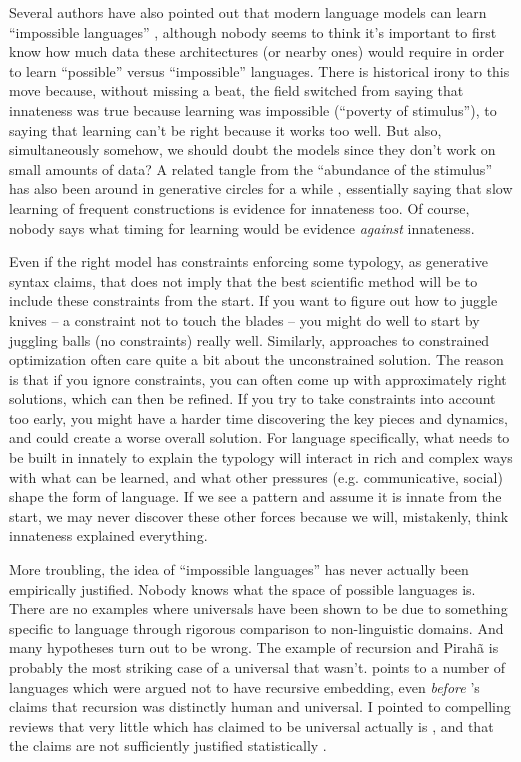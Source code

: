 \documentclass[output=paper,colorlinks,citecolor=brown]{langscibook}
\begin{document}
Several authors have also pointed out that modern language models can learn ``impossible languages'' \citep{milway2023response,moro2023large}, although nobody seems to think it's important to first know how much data these architectures (or nearby ones) would require in order to learn ``possible'' versus ``impossible'' languages. There is historical irony to this move because, without missing a beat, the field switched from saying that innateness was true because learning was impossible (``poverty of stimulus''), to saying that learning can't be right because it works too well. But also, simultaneously somehow, we should doubt the models since they don't work  on small amounts of data? A related tangle from the ``abundance of the stimulus'' has also been around in generative circles for a while \citep{babyonyshev2001maturation}, essentially saying that slow learning of frequent constructions is evidence for innateness too.  Of course, nobody says what timing for learning would be evidence \textit{against} innateness. 

\largerpage
Even if the right model has constraints enforcing some typology, as generative syntax claims, that does not imply that the best scientific method will be to include these constraints from the start. If you want to figure out how to juggle knives -- a constraint not to touch the blades -- you might do well to start by juggling balls (no constraints) really well. Similarly, approaches to constrained optimization often care quite a bit about the unconstrained solution. The reason is that if you ignore constraints, you can often come up with approximately right solutions, which can then be refined. If you try to take constraints into account too early, you might have a harder time discovering the key pieces and dynamics, and could create a worse overall solution. For language specifically, what needs to be built in innately to explain the typology will interact in rich and complex ways with what can be learned, and what other pressures (e.g. communicative, social) shape the form of language. If we see a pattern and assume it is innate from the start, we may never discover these other forces because we will, mistakenly, think innateness explained everything. 


More troubling, the idea of ``impossible languages'' has never actually been empirically justified. Nobody knows what the space of possible languages is. There are no examples where universals have been shown to be due to something specific to language through rigorous comparison to non-linguistic domains. And many hypotheses turn out to be wrong. The example of recursion and Pirah\~{a} is probably the most striking case of a universal that wasn't. \citet{pullum2023dan} points to a number of languages which were argued not to have recursive embedding, even \textit{before} \citet{hauser2002faculty}'s claims that recursion was distinctly human and universal. I pointed to compelling reviews that very little which has claimed to be universal actually is \citep{evans2009myth}, and that the claims are not sufficiently justified statistically \citep{piantadosi2014quantitative}. 
\end{document}
